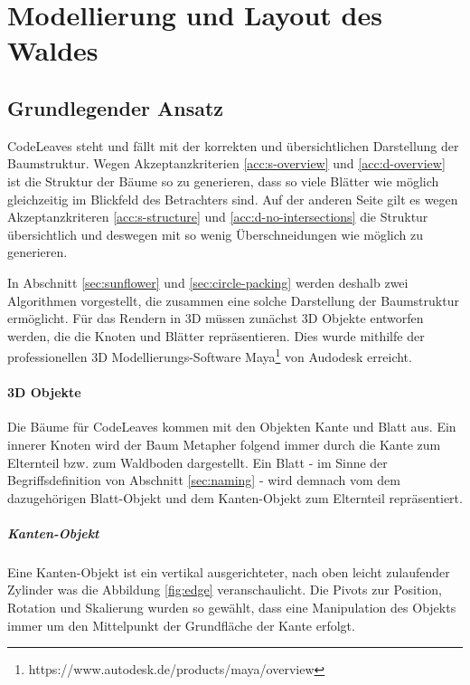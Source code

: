 \chapter{Modellierung und Layout des Waldes}
\label{ch:layout}

\section{Grundlegender Ansatz}

CodeLeaves steht und fällt mit der korrekten und übersichtlichen Darstellung der Baumstruktur. Wegen Akzeptanzkriterien \ref{acc:s-overview} und \ref{acc:d-overview} ist die Struktur der Bäume so zu generieren, dass so viele Blätter wie möglich gleichzeitig im Blickfeld des Betrachters sind. Auf der anderen Seite gilt es wegen Akzeptanzkriteren \ref{acc:s-structure} und \ref{acc:d-no-intersections} die Struktur übersichtlich und deswegen mit so wenig Überschneidungen wie möglich zu generieren.

In Abschnitt \ref{sec:sunflower} und \ref{sec:circle-packing} werden deshalb zwei Algorithmen vorgestellt, die zusammen eine solche Darstellung der Baumstruktur ermöglicht. Für das Rendern in 3D müssen zunächst 3D Objekte entworfen werden, die die Knoten und Blätter repräsentieren. Dies wurde mithilfe der professionellen 3D Modellierungs-Software Maya\footnote{https://www.autodesk.de/products/maya/overview} von Audodesk erreicht.

\subsubsection*{3D Objekte}

Die Bäume für CodeLeaves kommen mit den Objekten Kante und Blatt aus. Ein innerer Knoten wird der Baum Metapher folgend immer durch die Kante zum Elternteil bzw. zum Waldboden dargestellt. Ein Blatt - im Sinne der Begriffsdefinition von Abschnitt \ref{sec:naming} - wird demnach vom dem dazugehörigen Blatt-Objekt und dem Kanten-Objekt zum Elternteil repräsentiert.

\paragraph{Kanten-Objekt} Eine Kanten-Objekt ist ein vertikal ausgerichteter, nach oben leicht zulaufender Zylinder was die Abbildung \ref{fig:edge} veranschaulicht. Die Pivots zur Position, Rotation und Skalierung wurden so gewählt, dass eine Manipulation des Objekts immer um den Mittelpunkt der Grundfläche der Kante erfolgt.\\


